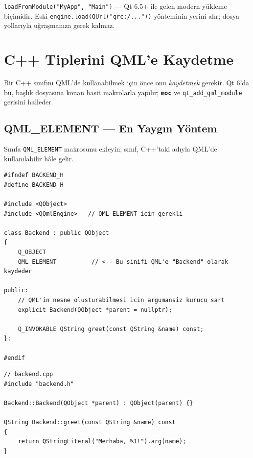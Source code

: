 \documentclass[11pt,a4paper]{article}
\newcommand{\kls}[1]{\texttt{\color{anaMavi}\textbf{#1}}}
\newcommand{\kod}[1]{\texttt{\color{koyuGri}#1}}
\begin{document}
\begin{ipucukutu}
\kod{loadFromModule("MyApp", "Main")} — Qt 6.5+ ile gelen modern yükleme
biçimidir. Eski \kod{engine.load(QUrl("qrc:/..."))} yönteminin yerini alır;
dosya yollarıyla uğraşmanıza gerek kalmaz.
\end{ipucukutu}

\section{C++ Tiplerini QML'e Kaydetme}

Bir C++ sınıfını QML'de kullanabilmek için önce onu \emph{kaydetmek} gerekir.
Qt 6'da bu, başlık dosyasına konan basit makrolarla yapılır; \kls{moc} ve
\kod{qt\_add\_qml\_module} gerisini halleder.

\subsection{QML\_ELEMENT — En Yaygın Yöntem}

Sınıfa \kod{QML\_ELEMENT} makrosunu ekleyin; sınıf, C++'taki adıyla QML'de
kullanılabilir hâle gelir.

\begin{ornekkutu}
\end{ornekkutu}
\begin{lstlisting}
#ifndef BACKEND_H
#define BACKEND_H

#include <QObject>
#include <QQmlEngine>   // QML_ELEMENT icin gerekli

class Backend : public QObject
{
    Q_OBJECT
    QML_ELEMENT          // <-- Bu sinifi QML'e "Backend" olarak kaydeder

public:
    // QML'in nesne olusturabilmesi icin argumansiz kurucu sart
    explicit Backend(QObject *parent = nullptr);

    Q_INVOKABLE QString greet(const QString &name) const;
};

#endif
\end{lstlisting}

\begin{lstlisting}[caption={}]
// backend.cpp
#include "backend.h"

Backend::Backend(QObject *parent) : QObject(parent) {}

QString Backend::greet(const QString &name) const
{
    return QStringLiteral("Merhaba, %1!").arg(name);
}
\end{lstlisting}
\end{document}
